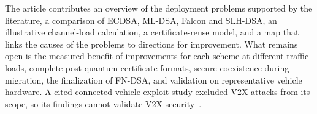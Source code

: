 \documentclass[11pt,a4paper]{article}
\begin{document}
The article contributes an overview of the deployment problems supported by the literature, a
comparison of ECDSA, ML-DSA, Falcon and SLH-DSA, an illustrative channel-load calculation, a
certificate-reuse model, and a map that links the causes of the problems to directions for
improvement. What remains open is the measured benefit of improvements for each scheme at
different traffic loads, complete post-quantum certificate formats, secure coexistence during
migration, the finalization of FN-DSA, and validation on representative vehicle hardware. A cited
connected-vehicle exploit study excluded V2X attacks from its scope, so its findings cannot
validate V2X security~\cite{wang}.

\small


\end{document}

